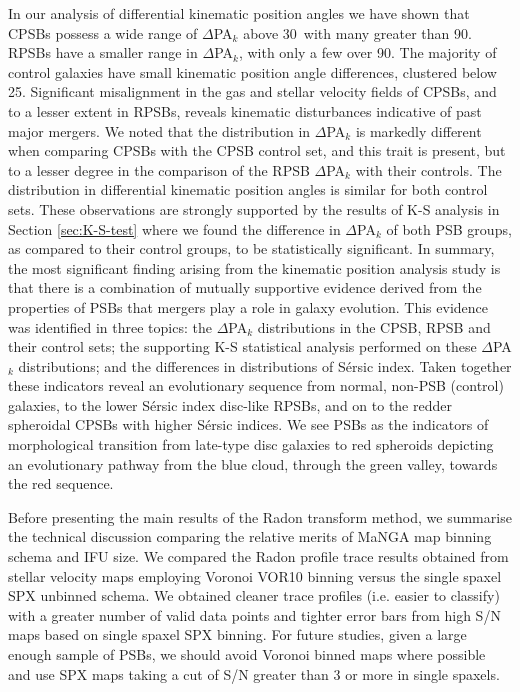 In our analysis of differential kinematic position angles we have shown that CPSBs possess a wide range of $\Delta$PA$_{k}$ above 30\textdegree\ with many greater than 90\textdegree. RPSBs have a smaller range in $\Delta$PA$_{k}$, with only a few over 90\textdegree. The majority of control galaxies have small kinematic position angle differences, clustered below 25\textdegree. Significant misalignment in the gas and stellar velocity fields of CPSBs, and to a lesser extent in RPSBs, reveals kinematic disturbances indicative of past major mergers.
We noted that the distribution in $\Delta$PA$_{k}$ is markedly different when comparing CPSBs with the CPSB control set, and this trait is present, but to a lesser degree in the comparison of the RPSB $\Delta$PA$_{k}$ with their controls. The distribution in differential kinematic position angles is similar for both control sets. These observations are strongly supported by the results of K-S analysis in Section \ref{sec:K-S-test} where we found the difference in $\Delta$PA$_{k}$ of both PSB groups, as compared to their control groups, to be statistically significant. In summary, the most significant finding arising from the kinematic position analysis study is that there is a combination of mutually supportive evidence derived from the properties of PSBs that mergers play a role in galaxy evolution. This evidence was identified in three topics: the $\Delta$PA$_{k}$ distributions in the CPSB, RPSB and their control sets; the supporting K-S statistical analysis performed on these $\Delta$PA$_{k}$ distributions; and the differences in distributions of S\'ersic index. Taken together these indicators reveal an evolutionary sequence from normal, non-PSB (control) galaxies, to the lower S\'ersic index disc-like RPSBs, and on to the redder spheroidal CPSBs with higher S\'ersic indices. We see PSBs as the indicators of morphological transition from late-type disc galaxies to red spheroids depicting an evolutionary pathway from the blue cloud, through the green valley, towards the red sequence.

Before presenting the main results of the Radon transform method, we summarise the technical discussion comparing the relative merits of MaNGA map binning schema and IFU size. We compared the Radon profile trace results obtained from stellar velocity maps employing Voronoi VOR10 binning versus the single spaxel SPX unbinned schema. We obtained cleaner trace profiles (i.e. easier to classify) with a greater number of valid data points and tighter error bars from high S/N maps based on single spaxel SPX binning. For future studies, given a large enough sample of PSBs, we should avoid Voronoi binned maps where possible and use SPX maps taking a cut of S/N greater than 3 or more in single spaxels.

